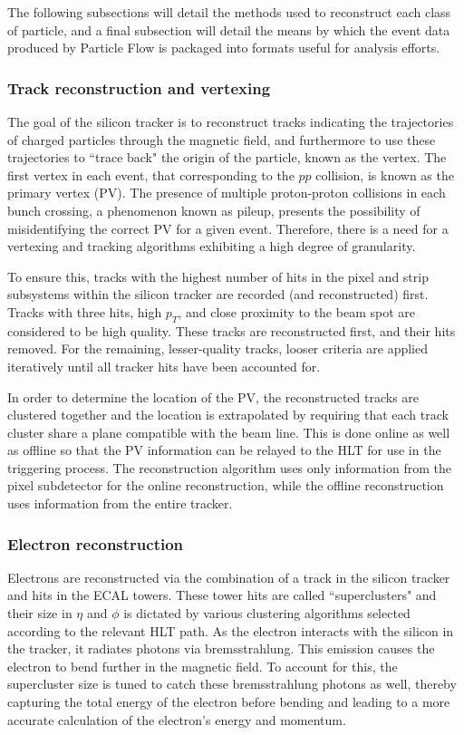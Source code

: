 The following subsections will detail the methods used to reconstruct each class of particle, and a final subsection will detail the means by which the event data produced by Particle Flow is packaged into formats useful for analysis efforts.

\subsubsection{Track reconstruction and vertexing}\label{sec:TrackReco}

The goal of the silicon tracker is to reconstruct tracks indicating the trajectories of charged particles through the magnetic field, and furthermore to use these trajectories to ``trace back" the origin of the particle, known as the vertex. The first vertex in each event, that corresponding to the $pp$ collision, is known as the primary vertex (PV). The presence of multiple proton-proton collisions in each bunch crossing, a phenomenon known as pileup, presents the possibility of misidentifying the correct PV for a given event. Therefore, there is a need for a vertexing and tracking algorithms exhibiting a high degree of granularity.

To ensure this, tracks with the highest number of hits in the pixel and strip subsystems within the silicon tracker are recorded (and reconstructed) first. Tracks with three hits, high $p_{T}$, and close proximity to the beam spot are considered to be high quality. These tracks are reconstructed first, and their hits removed. For the remaining, lesser-quality tracks, looser criteria are applied iteratively until all tracker hits have been accounted for.

In order to determine the location of the PV, the reconstructed tracks are clustered together and the location is extrapolated by requiring that each track cluster share a plane compatible with the beam line. This is done online as well as offline so that the PV information can be relayed to the HLT for use in the triggering process. The reconstruction algorithm   uses only information from the pixel subdetector for the online reconstruction, while the offline reconstruction uses information from the entire tracker.

\subsubsection{Electron reconstruction}

Electrons are reconstructed via the combination of a track in the silicon tracker and hits in the ECAL towers. These tower hits are called ``superclusters" and their size in $\eta$ and $\phi$ is dictated by various clustering algorithms selected according to the relevant HLT path. As the electron interacts with the silicon in the tracker, it radiates photons via bremsstrahlung. This emission causes the electron to bend further in the magnetic field. To account for this, the supercluster size is tuned to catch these bremsstrahlung photons as well, thereby capturing the total energy of the electron before bending and leading to a more accurate calculation of the electron's energy and momentum. 

